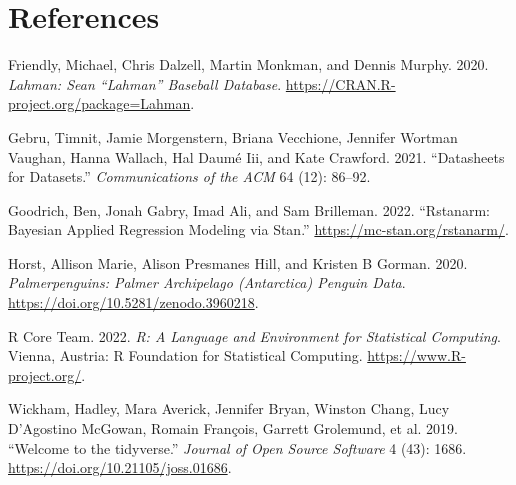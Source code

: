 \documentclass[
  letterpaper,
  DIV=11,
  numbers=noendperiod]{scrartcl}
\newlength{\cslhangindent}
\newenvironment{CSLReferences}[2] %
 {\begin{list}{}{%
  \setlength{\itemindent}{0pt}
  \setlength{\leftmargin}{0pt}
  \setlength{\parsep}{0pt}
  \ifodd #1
   \setlength{\leftmargin}{\cslhangindent}
   \setlength{\itemindent}{-1\cslhangindent}
  \fi
  \setlength{\itemsep}{#2\baselineskip}}}
 {\end{list}}
\begin{document}
\newpage

\section*{References}\label{references}

\label{refs}
\begin{CSLReferences}{1}{0}
Friendly, Michael, Chris Dalzell, Martin Monkman, and Dennis Murphy.
2020. \emph{Lahman: Sean {``Lahman''} Baseball Database}.
\url{https://CRAN.R-project.org/package=Lahman}.

Gebru, Timnit, Jamie Morgenstern, Briana Vecchione, Jennifer Wortman
Vaughan, Hanna Wallach, Hal Daumé Iii, and Kate Crawford. 2021.
{``Datasheets for Datasets.''} \emph{Communications of the ACM} 64 (12):
86--92.

Goodrich, Ben, Jonah Gabry, Imad Ali, and Sam Brilleman. 2022.
{``Rstanarm: {Bayesian} Applied Regression Modeling via {Stan}.''}
\url{https://mc-stan.org/rstanarm/}.

Horst, Allison Marie, Alison Presmanes Hill, and Kristen B Gorman. 2020.
\emph{Palmerpenguins: Palmer Archipelago (Antarctica) Penguin Data}.
\url{https://doi.org/10.5281/zenodo.3960218}.

R Core Team. 2022. \emph{R: A Language and Environment for Statistical
Computing}. Vienna, Austria: R Foundation for Statistical Computing.
\url{https://www.R-project.org/}.

Wickham, Hadley, Mara Averick, Jennifer Bryan, Winston Chang, Lucy
D'Agostino McGowan, Romain François, Garrett Grolemund, et al. 2019.
{``Welcome to the {tidyverse}.''} \emph{Journal of Open Source Software}
4 (43): 1686. \url{https://doi.org/10.21105/joss.01686}.

\end{CSLReferences}
\end{document}
